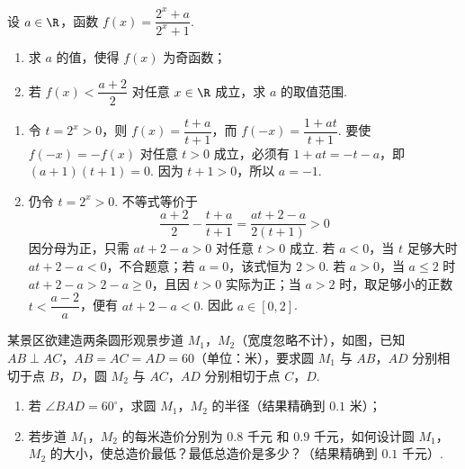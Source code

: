 \begin{problem}
设 \(a\in\R\)，函数 \(f(x)=\dfrac{2^x+a}{2^x+1}\).

\begin{enumerate}
\item 求 \(a\) 的值，使得 \(f(x)\) 为奇函数；
\item 若 \(f(x)<\dfrac{a+2}{2}\) 对任意 \(x\in\R\) 成立，求 \(a\) 的取值范围.
\end{enumerate}
\end{problem}

\begin{solution}
\begin{enumerate}
\item 令 \(t=2^x>0\)，则 \(f(x)=\dfrac{t+a}{t+1}\)，而 \(f(-x)=\dfrac{1+at}{t+1}\). 要使 \(f(-x)=-f(x)\) 对任意 \(t>0\) 成立，必须有 \(1+at=-t-a\)，即 \((a+1)(t+1)=0\). 因为 \(t+1>0\)，所以 \(a=-1\).
\item 仍令 \(t=2^x>0\). 不等式等价于
\[
\frac{a+2}{2}-\frac{t+a}{t+1}=\frac{at+2-a}{2(t+1)}>0
\]
因分母为正，只需 \(at+2-a>0\) 对任意 \(t>0\) 成立. 若 \(a<0\)，当 \(t\) 足够大时 \(at+2-a<0\)，不合题意；若 \(a=0\)，该式恒为 \(2>0\). 若 \(a>0\)，当 \(a\leq2\) 时 \(at+2-a>2-a\geq0\)，且因 \(t>0\) 实际为正；当 \(a>2\) 时，取足够小的正数 \(t<\dfrac{a-2}{a}\)，便有 \(at+2-a<0\). 因此 \(a\in[0,2]\).
\end{enumerate}
\end{solution}

\begin{problem}
某景区欲建造两条圆形观景步道 \(M_1\)，\(M_2\)（宽度忽略不计），如图，已知 \(AB\perp AC\)，\(AB=AC=AD=60\)（单位：米），要求圆 \(M_1\) 与 \(AB\)，\(AD\) 分别相切于点 \(B\)，\(D\)，圆 \(M_2\) 与 \(AC\)，\(AD\) 分别相切于点 \(C\)，\(D\).

\begin{enumerate}
\item 若 \(\angle BAD=60^\circ\)，求圆 \(M_1\)，\(M_2\) 的半径（结果精确到 \(0.1\) 米）；
\item 若步道 \(M_1\)，\(M_2\) 的每米造价分别为 \(0.8\text{ 千元}\) 和 \(0.9\text{ 千元}\)，如何设计圆 \(M_1\)，\(M_2\) 的大小，使总造价最低？最低总造价是多少？（结果精确到 \(0.1\text{ 千元}\)）.
\end{enumerate}

\end{problem}

